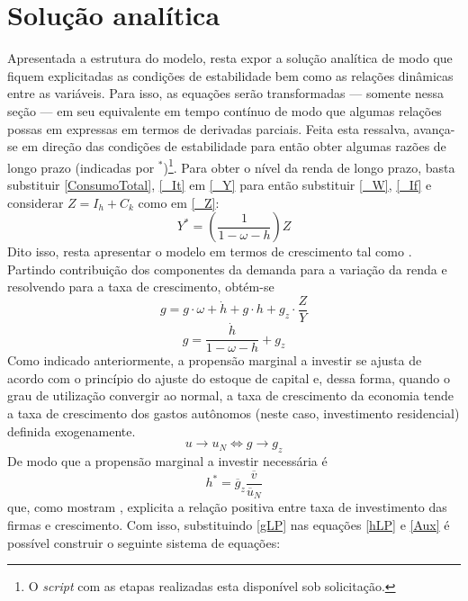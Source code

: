 \section{Solução analítica}
\label{SecAnalitica}

Apresentada a estrutura do modelo, resta expor a solução analítica de modo que fiquem explicitadas as condições de estabilidade bem como as relações dinâmicas entre as variáveis. 
Para isso, as equações serão transformadas --- somente nessa seção --- em seu equivalente em tempo contínuo de modo que algumas relações possas em expressas em termos de derivadas parciais.
Feita esta ressalva, avança-se em direção das condições de estabilidade para então obter algumas razões de longo prazo (indicadas por $^*$)\footnote{O \textit{script} com as etapas realizadas esta disponível sob solicitação.}.
Para obter o nível da renda de longo prazo, basta substituir \ref{ConsumoTotal}, \ref{_It} em \ref{_Y} para então substituir \ref{_W}, \ref{_If} e considerar $Z = I_h + C_k$ como em \ref{_Z}:
\begin{equation}
    \label{AnaliticaNivel}
    Y^* = \left(\frac{1}{1-\omega - h}\right)Z
\end{equation}
Dito isso, resta apresentar o modelo em termos de crescimento tal como \textcite{freitas_growth_2015}. Partindo contribuição dos componentes da demanda para a variação da renda e resolvendo para a taxa de crescimento, obtém-se
$$
g = g\cdot \omega + \dot h + g\cdot h + g_z\cdot \frac{Z}{Y}
$$
\begin{equation}
\label{gLP}
    g = \frac{\dot h}{1 - \omega - h} + g_z
\end{equation}
Como indicado anteriormente, a propensão marginal a investir se ajusta de acordo com o princípio do ajuste do estoque de capital e, dessa forma, quando o grau de utilização convergir ao normal, a taxa de crescimento da economia tende a taxa de crescimento dos gastos autônomos (neste caso, investimento residencial) definida exogenamente. 
\begin{equation}
u \to u_N \Leftrightarrow g \to g_z
\end{equation}
De modo que a propensão marginal a investir necessária é
\begin{equation}
\label{hLP}
h^* = \overline g_z\frac{\overline v}{\overline u_N}
\end{equation}
que, como mostram \textcite{fagundes_role_2017}, explicita a relação positiva entre taxa de investimento das firmas e crescimento. Com isso, substituindo \ref{gLP} nas equações \ref{hLP} e \ref{Aux} é possível construir o seguinte sistema de equações:

